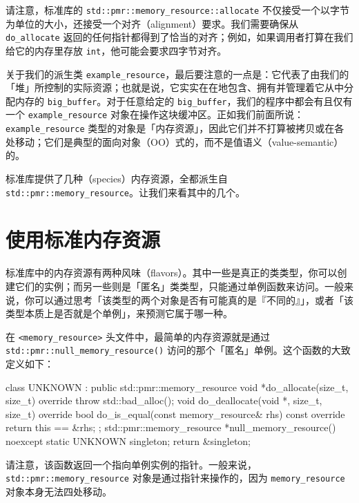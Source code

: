 请注意，标准库的 \texttt{std::\allowbreak{}pmr::\allowbreak{}memory\_\allowbreak{}resource::\allowbreak{}allocate} 不仅接受一个以字节为单位的大小，还接受一个对齐（alignment）要求。我们需要确保从 \texttt{do\_\allowbreak{}allocate} 返回的任何指针都得到了恰当的对齐；例如，如果调用者打算在我们给它的内存里存放 \texttt{int}，他可能会要求四字节对齐。

关于我们的派生类 \texttt{example\_\allowbreak{}resource}，最后要注意的一点是：它代表了由我们的「堆」所控制的实际资源；也就是说，它实实在在地包含、拥有并管理着它从中分配内存的 \texttt{big\_\allowbreak{}buffer}。对于任意给定的 \texttt{big\_\allowbreak{}buffer}，我们的程序中都会有且仅有一个 \texttt{example\_\allowbreak{}resource} 对象在操作这块缓冲区。正如我们前面所说：\texttt{example\_\allowbreak{}resource} 类型的对象是「内存资源」，因此它们并不打算被拷贝或在各处移动；它们是典型的面向对象（OO）式的，而不是值语义（value-semantic）的。

标准库提供了几种（species）内存资源，全都派生自 \texttt{std::\allowbreak{}pmr::\allowbreak{}memory\_\allowbreak{}resource}。让我们来看其中的几个。

\section{使用标准内存资源}

标准库中的内存资源有两种风味（flavors）。其中一些是真正的类类型，你可以创建它们的实例；而另一些则是「匿名」类类型，只能通过单例函数来访问。一般来说，你可以通过思考「该类型的两个对象是否有可能真的是『不同的』」，或者「该类型本质上是否就是个单例」，来预测它属于哪一种。

在 \texttt{<memory\_\allowbreak{}resource>\allowbreak{}} 头文件中，最简单的内存资源就是通过 \texttt{std::\allowbreak{}pmr::\allowbreak{}null\_\allowbreak{}memory\_\allowbreak{}resource(\allowbreak{})\allowbreak{}} 访问的那个「匿名」单例。这个函数的大致定义如下：

\begin{codebox}[cpp]
    class UNKNOWN : public std::pmr::memory_resource {
      void *do_allocate(size_t, size_t) override {
        throw std::bad_alloc();
      }
      void do_deallocate(void *, size_t, size_t) override {}
      bool do_is_equal(const memory_resource& rhs) const override {
        return this == &rhs;
      }
    };
    std::pmr::memory_resource *null_memory_resource() noexcept {
      static UNKNOWN singleton;
      return &singleton;
    }
\end{codebox}

请注意，该函数返回一个指向单例实例的指针。一般来说，\texttt{std::\allowbreak{}pmr::\allowbreak{}memory\_\allowbreak{}resource} 对象是通过指针来操作的，因为 \texttt{memory\_\allowbreak{}resource} 对象本身无法四处移动。

